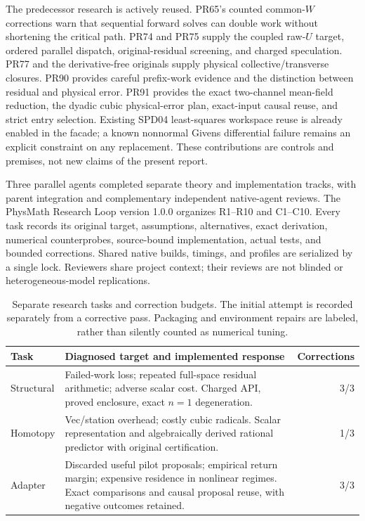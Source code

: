\documentclass[aps,pra,reprint,onecolumn,12pt,notitlepage,superscriptaddress,nofootinbib]{revtex4-2}
\begin{document}
The predecessor research is actively reused. PR65's counted common-$W$
corrections warn that sequential forward solves can double work without
shortening the critical path. PR74 and PR75 supply the coupled raw-$U$
target, ordered parallel dispatch, original-residual screening, and charged
speculation. PR77 and the derivative-free originals supply physical
collective/transverse closures. PR90 provides careful prefix-work evidence
and the distinction between residual and physical error. PR91 provides the
exact two-channel mean-field reduction, the dyadic cubic physical-error
plan, exact-input causal reuse, and strict entry selection. Existing SPD04
least-squares workspace reuse is already enabled in the facade; a known
nonnormal Givens differential failure remains an explicit constraint on any
replacement. These contributions are controls and premises, not new claims
of the present report.

Three parallel agents completed separate theory and implementation tracks,
with parent integration and complementary independent native-agent reviews.
The PhysMath Research Loop version 1.0.0 organizes R1--R10 and C1--C10.
Every task records its original target, assumptions, alternatives, exact
derivation, numerical counterprobes, source-bound implementation, actual
tests, and bounded corrections. Shared native builds, timings, and profiles
are serialized by a single lock. Reviewers share project context; their
reviews are not blinded or heterogeneous-model replications.

\begin{table}[tb]
\caption{Separate research tasks and correction budgets. The initial attempt
is recorded separately from a corrective pass. Packaging and environment
repairs are labeled, rather than silently counted as numerical tuning.}
\begin{ruledtabular}
\begin{tabular}{p{}p{}r}
Task & Diagnosed target and implemented response & Corrections\\
\hline
Structural & Failed-work loss; repeated full-space residual arithmetic;
adverse scalar cost. Charged API, proved enclosure, exact $n=1$ degeneration. & 3/3\\
Homotopy & Vec/station overhead; costly cubic radicals. Scalar representation
and algebraically derived rational predictor with original certification. & 1/3\\
Adapter & Discarded useful pilot proposals; empirical return margin;
expensive residence in nonlinear regimes. Exact comparisons and causal
proposal reuse, with negative outcomes retained. & 3/3
\end{tabular}
\end{ruledtabular}
\end{table}
\end{document}
